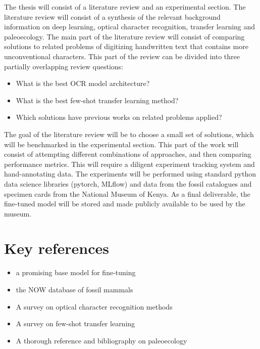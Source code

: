 \documentclass{article}
\begin{document}

The thesis will consist of a literature review and an experimental section.
The literature review will consist of a synthesis of the relevant background 
information on deep learning, optical character recognition, transfer learning and 
paleoecology.
The main part of the literature review will consist of comparing
solutions to related problems of digitizing handwritten text that contains 
more unconventional characters. This part of the review can be divided into three partially overlapping review 
questions:

\begin{itemize}
    \item What is the best OCR model architecture?
    \item What is the best few-shot transfer learning method?
    \item Which solutions have previous works on related problems applied?
\end{itemize}

The goal of the literature review will be to choose a small set of solutions, which will be 
benchmarked in the experimental section. This part of the work will consist of attempting 
different combinations of approaches, and then comparing performance metrics. This will require a 
diligent experiment tracking system and hand-annotating data. The experiments will be performed 
using standard python data science libraries (pytorch, MLflow) and
 data from the fossil catalogues and specimen cards from the National Museum of Kenya. As a final deliverable,
 the fine-tuned model will be stored and made publicly available to be used by the museum.

\section{Key references}

\begin{itemize}
    \item \cite{li2021trocr} a promising base model for fine-tuning
    \item \cite{Žliobaitė2023} the NOW database of fossil mammals
    \item \cite{9151144} A survey on optical character recognition methods 
    \item \cite{10.1145/3582688} A survey on few-shot transfer learning
    \item \cite{Faith_Lyman_2019} A thorough reference and bibliography on paleoecology
\end{itemize}

\printbibliography
\end{document}

